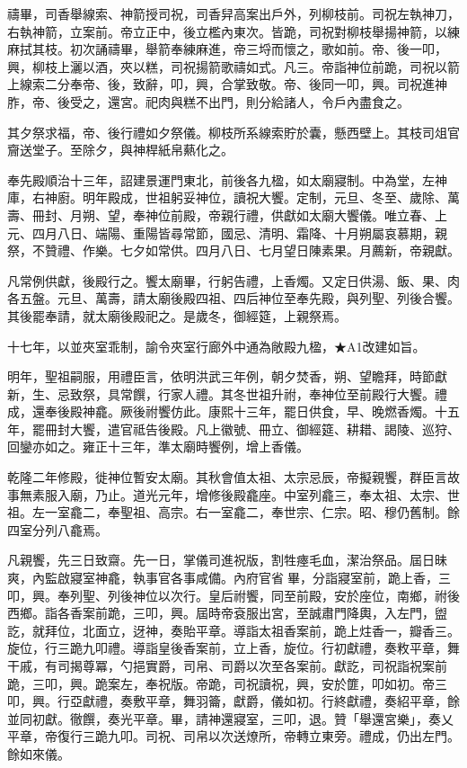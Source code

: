 \begin{pinyinscope}
禱畢，司香舉線索、神箭授司祝，司香舁高案出戶外，列柳枝前。司祝左執神刀，右執神箭，立案前。帝立正中，後立檻內東次。皆跪，司祝對柳枝舉揚神箭，以練麻拭其枝。初次誦禱畢，舉箭奉練麻進，帝三埒而懷之，歌如前。帝、後一叩，興，柳枝上灑以酒，夾以糕，司祝揚箭歌禱如式。凡三。帝詣神位前跪，司祝以箭上線索二分奉帝、後，致辭，叩，興，合掌致敬。帝、後同一叩，興。司祝進神胙，帝、後受之，還宮。祀肉與糕不出門，則分給諸人，令戶內盡食之。

其夕祭求福，帝、後行禮如夕祭儀。柳枝所系線索貯於囊，懸西壁上。其枝司俎官齎送堂子。至除夕，與神桿紙帛爇化之。

奉先殿順治十三年，詔建景運門東北，前後各九楹，如太廟寢制。中為堂，左神庫，右神廚。明年殿成，世祖躬妥神位，讀祝大饗。定制，元旦、冬至、歲除、萬壽、冊封、月朔、望，奉神位前殿，帝親行禮，供獻如太廟大饗儀。唯立春、上元、四月八日、端陽、重陽皆尋常節，國忌、清明、霜降、十月朔屬哀慕期，親祭，不贊禮、作樂。七夕如常供。四月八日、七月望日陳素果。月薦新，帝親獻。

凡常例供獻，後殿行之。饗太廟畢，行躬告禮，上香燭。又定日供湯、飯、果、肉各五盤。元旦、萬壽，請太廟後殿四祖、四后神位至奉先殿，與列聖、列後合饗。其後罷奉請，就太廟後殿祀之。是歲冬，御經筵，上親祭焉。

十七年，以並夾室乖制，諭令夾室行廊外中通為敞殿九楹，★A1改建如旨。

明年，聖祖嗣服，用禮臣言，依明洪武三年例，朝夕焚香，朔、望瞻拜，時節獻新，生、忌致祭，具常饌，行家人禮。其冬世祖升祔，奉神位至前殿行大饗。禮成，還奉後殿神龕。厥後祔饗仿此。康熙十三年，罷日供食，早、晚燃香燭。十五年，罷冊封大饗，遣官祗告後殿。凡上徽號、冊立、御經筵、耕耤、謁陵、巡狩、回鑾亦如之。雍正十三年，準太廟時饗例，增上香儀。

乾隆二年修殿，徙神位暫安太廟。其秋會值太祖、太宗忌辰，帝擬親饗，群臣言故事無素服入廟，乃止。道光元年，增修後殿龕座。中室列龕三，奉太祖、太宗、世祖。左一室龕二，奉聖祖、高宗。右一室龕二，奉世宗、仁宗。昭、穆仍舊制。餘四室分列八龕焉。

凡親饗，先三日致齋。先一日，掌儀司進祝版，割牲瘞毛血，潔治祭品。屆日昧爽，內監啟寢室神龕，執事官各事咸備。內府官省畢，分詣寢室前，跪上香，三叩，興。奉列聖、列後神位以次行。皇后祔饗，同至前殿，安於座位，南鄉，祔後西鄉。詣各香案前跪，三叩，興。屆時帝袞服出宮，至誠肅門降輿，入左門，盥訖，就拜位，北面立，迓神，奏貽平章。導詣太祖香案前，跪上炷香一，瓣香三。旋位，行三跪九叩禮。導詣皇後香案前，立上香，旋位。行初獻禮，奏敉平章，舞干戚，有司揭尊冪，勺挹實爵，司帛、司爵以次至各案前。獻訖，司祝詣祝案前跪，三叩，興。跪案左，奉祝版。帝跪，司祝讀祝，興，安於篚，叩如初。帝三叩，興。行亞獻禮，奏敷平章，舞羽籥，獻爵，儀如初。行終獻禮，奏紹平章，餘並同初獻。徹饌，奏光平章。畢，請神還寢室，三叩，退。贊「舉還宮樂」，奏乂平章，帝復行三跪九叩。司祝、司帛以次送燎所，帝轉立東旁。禮成，仍出左門。餘如來儀。


\end{pinyinscope}
